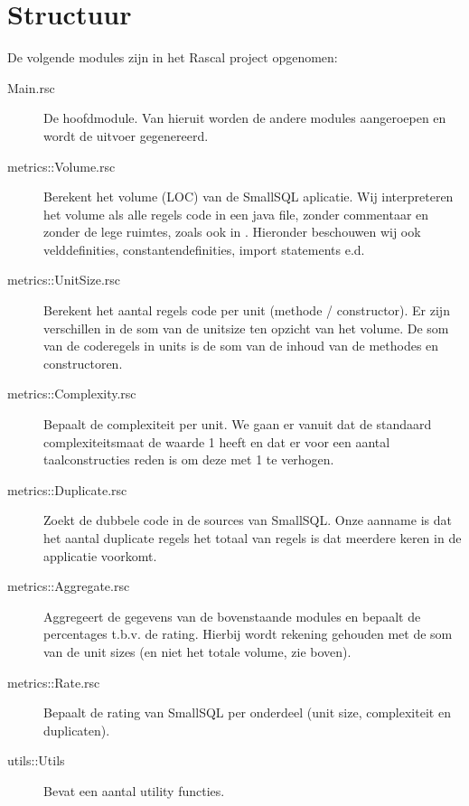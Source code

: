 \documentclass[a4paper]{article}
\begin{document}
\section{Structuur}
\label{sec:Structuur}
De volgende modules zijn in het Rascal project opgenomen:
\begin{description}
\item[Main.rsc] De hoofdmodule. Van hieruit worden de andere modules aangeroepen en wordt de uitvoer gegenereerd.
\item[metrics::Volume.rsc] Berekent het volume (LOC) van de SmallSQL aplicatie. Wij interpreteren het volume als alle regels code in een java file, zonder commentaar en zonder de lege ruimtes, zoals ook in \cite{A}. Hieronder beschouwen wij ook velddefinities, constantendefinities, import statements e.d.
\item[metrics::UnitSize.rsc] Berekent het aantal regels code per unit (methode / constructor). Er zijn verschillen in de som van de unitsize ten opzicht van het volume. De som van de coderegels in units is de som van de inhoud van de methodes en constructoren.
\item[metrics::Complexity.rsc] Bepaalt de complexiteit per unit. We gaan er vanuit dat de standaard complexiteitsmaat de waarde 1 heeft en dat er voor een aantal taalconstructies reden is om deze met 1 te verhogen.
\item[metrics::Duplicate.rsc] Zoekt de dubbele code in de sources van SmallSQL. Onze aanname is dat het aantal duplicate regels het totaal van regels is dat meerdere keren in de applicatie voorkomt.
\item[metrics::Aggregate.rsc] Aggregeert de gegevens van de bovenstaande modules en bepaalt de percentages t.b.v. de rating. Hierbij wordt rekening gehouden met de som van de unit sizes (en niet het totale volume, zie boven).
\item[metrics::Rate.rsc] Bepaalt de rating van SmallSQL per onderdeel (unit size, complexiteit en duplicaten).
\item[utils::Utils] Bevat een aantal utility functies.
\end{description}
\end{document}
